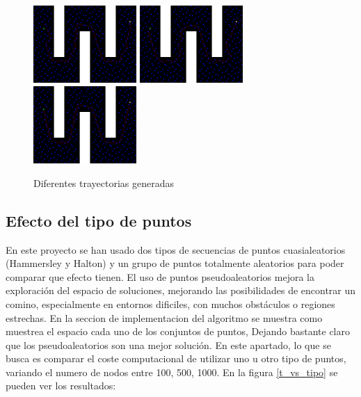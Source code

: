 \begin{figure}[h]
		\centering
        \includegraphics[width=0.35\textwidth]{images/a500.png}
        \includegraphics[width=0.35\textwidth]{images/d500.png}
        \includegraphics[width=0.35\textwidth]{images/s500.png}
        \caption{Diferentes trayectorias generadas}
        \label{fig:comp_paths}
\end{figure}

\subsection{Efecto del tipo de puntos}

En este proyecto se han usado dos tipos de secuencias de puntos cuasialeatorios (Hammersley y Halton) y un grupo de puntos totalmente aleatorios para poder comparar que efecto tienen. El uso de puntos pseudoaleatorios mejora la exploración del espacio de soluciones, mejorando las posibilidades de encontrar un comino, especialmente en entornos dificiles, con muchos obstáculos o regiones estrechas. En la seccion de implementacion del algoritmo se muestra como muestrea el espacio cada uno de los conjuntos de puntos, Dejando bastante claro que los pseudoaleatorios son una mejor solución. En este apartado, lo que se busca es comparar el coste computacional de utilizar uno u otro tipo de puntos, variando el numero de nodos entre 100, 500, 1000. En la figura \ref{t_vs_tipo} se pueden ver los resultados:\\

